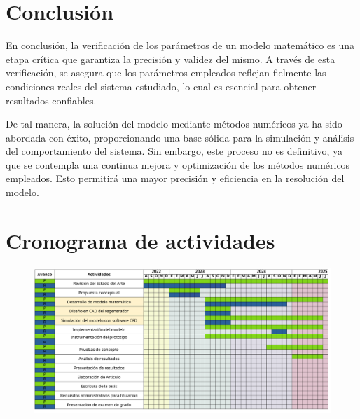 \documentclass[12pt,letterpaper,final]{article}%
\begin{document}
\section{Conclusión}
En conclusión, la verificación de los parámetros de un modelo matemático es una etapa crítica que garantiza la precisión y validez del mismo. A través de esta verificación, se asegura que los parámetros empleados reflejan fielmente las condiciones reales del sistema estudiado, lo cual es esencial para obtener resultados confiables.

De tal manera, la solución del modelo mediante métodos numéricos ya ha sido abordada con éxito, proporcionando una base sólida para la simulación y análisis del comportamiento del sistema. Sin embargo, este proceso no es definitivo, ya que se contempla una continua mejora y optimización de los métodos numéricos empleados. Esto permitirá una mayor precisión y eficiencia en la resolución del modelo. 


\newpage
\section{Cronograma de actividades}
\begin{figure}[ht!]
	\includegraphics[scale=0.6]{crono_grama.pdf}
\end{figure}
\newpage


\newpage
	\appendix
\end{document}
